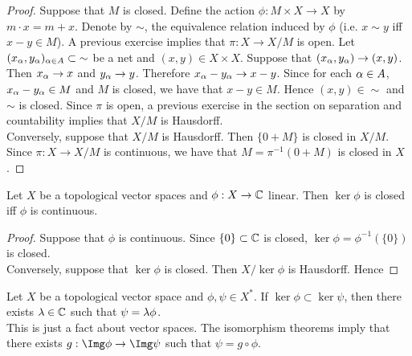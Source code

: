 \documentclass{book}
\begin{document}
	\begin{proof}
		Suppose that $M$ is closed. Define the action $\phi: M \times X \rightarrow X$ by $m \cdot x = m  + x$. Denote by $\sim$, the equivalence relation induced by $\phi$ (i.e. $x \sim y$ iff $x-y \in M$). A previous exercise implies that $\pi: X \rightarrow X /M$ is open. Let $(x_{\alpha},y_{\alpha})_{\alpha \in A} \subset  {\sim}$ be a net and $(x,y) \in X \times X$. Suppose that $(x_{\alpha},y_{\alpha}) \rightarrow (x,y)$. Then $x_{\alpha} \rightarrow x$ and $y_{\alpha} \rightarrow y$. Therefore $x_{\alpha} - y_{\alpha} \rightarrow x -y$. Since for each $\alpha \in A$, $x_{\alpha} - y_{\alpha} \in M$ and $M$ is closed, we have that $x -y \in M$. Hence $(x,y) \in  {\sim}$ and $\sim$ is closed. Since $\pi$ is open, a previous exercise in the section on separation and countability implies that $X / M$ is Hausdorff. \\
		Conversely, suppose that $X/ M$ is Hausdorff. Then $\{0 + M\}$ is closed in $X /M$. Since $\pi: X \rightarrow X/M$ is continuous, we have that $M =  \pi^{-1}(0 + M)$ is closed in $X$.
	\end{proof}

	\begin{ex}
		Let $X$ be a topological vector spaces and $\phi : X \rightarrow \mathbb{C}$ linear. Then $\ker \phi$ is closed iff $\phi$ is continuous. \\
	\end{ex}
	
	\begin{proof}
		Suppose that $\phi$ is continuous. Since $\{0\} \subset \mathbb{C}$ is closed, $\ker \phi = \phi^{-1}(\{0\})$ is closed. \\ Conversely, suppose that $\ker \phi$ is closed. Then $X/ \ker \phi$ is Hausdorff. Hence 
		\tcb{FINISH!!!}
	\end{proof}
	
	\begin{ex}
		Let $X$ be a topological vector space and $\phi,\psi \in X^*$. If $\ker  \phi \subset \ker \psi$, then there exists $\lambda \in \mathbb{C}$ such that $\psi = \lambda \phi$.\\
		 This is just a fact about vector spaces. The isomorphism theorems imply that there exists $g: \Img \phi \rightarrow \Img \psi$ such that $\psi = g \circ \phi$. 
	\end{ex}
\end{document}
